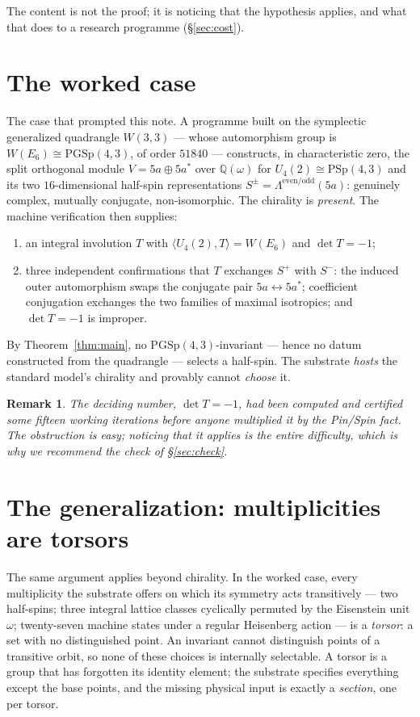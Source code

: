 \documentclass[11pt]{article}
\newtheorem{remark}[theorem]{Remark}
\begin{document}
The content is not the proof; it is noticing that the hypothesis applies, and
what that does to a research programme (\S\ref{sec:cost}).

\section{The worked case}\label{sec:case}

The case that prompted this note. A programme built on the symplectic
generalized quadrangle $W(3,3)$ --- whose automorphism group is
$W(E_6)\cong\mathrm{PGSp}(4,3)$, of order $51840$ --- constructs, in
characteristic zero, the split orthogonal module $V=5a\oplus5a^*$ over
$\mathbb Q(\omega)$ for $U_4(2)\cong\mathrm{PSp}(4,3)$ and its two
$16$-dimensional half-spin representations
$S^\pm=\Lambda^{\mathrm{even/odd}}(5a)$: genuinely complex, mutually
conjugate, non-isomorphic. The chirality is \emph{present}. The machine
verification then supplies:
\begin{enumerate}
\item an integral involution $T$ with $\langle U_4(2),T\rangle=W(E_6)$ and
$\det T=-1$;
\item three independent confirmations that $T$ exchanges $S^+$ with $S^-$:
the induced outer automorphism swaps the conjugate pair $5a\leftrightarrow
5a^*$; coefficient conjugation exchanges the two families of maximal
isotropics; and $\det T=-1$ is improper.
\end{enumerate}
By Theorem~\ref{thm:main}, no $\mathrm{PGSp}(4,3)$-invariant --- hence no
datum constructed from the quadrangle --- selects a half-spin. The substrate
\emph{hosts} the standard model's chirality and provably cannot \emph{choose}
it.

\begin{remark}
The deciding number, $\det T=-1$, had been computed and certified some fifteen
working iterations before anyone multiplied it by the Pin/Spin fact. The
obstruction is easy; \emph{noticing that it applies} is the entire difficulty,
which is why we recommend the check of \S\ref{sec:check}.
\end{remark}

\section{The generalization: multiplicities are torsors}

The same argument applies beyond chirality. In the worked case, every
multiplicity the substrate offers on which its symmetry acts transitively ---
two half-spins; three integral lattice classes cyclically permuted by the
Eisenstein unit $\omega$; twenty-seven machine states under a regular
Heisenberg action --- is a \emph{torsor}: a set with no distinguished point.
An invariant cannot distinguish points of a transitive orbit, so none of these
choices is internally selectable. A torsor is a group that has forgotten its
identity element; the substrate specifies everything except the base points,
and the missing physical input is exactly a \emph{section}, one per torsor.
\end{document}
